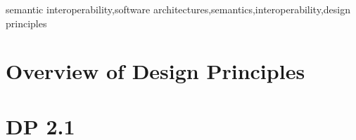 \documentclass[sort&compress,preprint,authoryear,3p,twocolumn]{elsarticle}
\begin{document}
\begin{frontmatter}


\begin{keyword}
semantic interoperability\sep software
architectures\sep semantics\sep interoperability\sep design principles
\end{keyword}

\end{frontmatter}

\linenumbers



\hypertarget{overview-of-design-principles}{%
\section{Overview of Design
Principles}\label{overview-of-design-principles}}

\hypertarget{dp-2.1}{%
\section{DP 2.1}\label{dp-2.1}}
\end{document}
